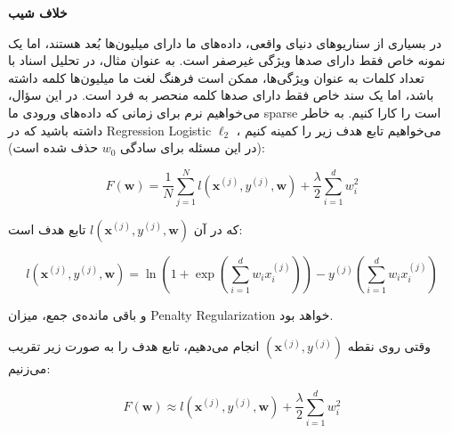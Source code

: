 \textbf{خلاف شیب}

در بسیاری از سناریوهای دنیای واقعی، داده‌های ما دارای میلیون‌ها بُعد هستند، اما یک نمونه خاص فقط دارای صدها ویژگی غیرصفر است. به عنوان مثال، در تحلیل اسناد با تعداد کلمات به عنوان ویژگی‌ها، ممکن است فرهنگ لغت ما میلیون‌ها کلمه داشته باشد، اما یک سند خاص فقط دارای صدها کلمه منحصر به فرد است. در این سؤال، می‌خواهیم نرم  برای زمانی که داده‌های ورودی ما sparse است را کارا کنیم. به خاطر داشته باشید که در Regression Logistic \(\ell_2\) ، می‌خواهیم تابع هدف زیر را کمینه کنیم (در این مسئله برای سادگی \(w_0\) حذف شده است):

\begin{latin}
\[
F(\mathbf{w}) = \frac{1}{N} \sum_{j=1}^N l(\mathbf{x}^{(j)}, y^{(j)}, \mathbf{w}) + \frac{\lambda}{2} \sum_{i=1}^d w_i^2
\]
\end{latin}

که در آن \(l(\mathbf{x}^{(j)}, y^{(j)}, \mathbf{w})\) تابع هدف است:

\begin{latin}
    
\[
l(\mathbf{x}^{(j)}, y^{(j)}, \mathbf{w}) =\ln \left( 1 + \exp \left( \sum_{i=1}^d w_i x_i^{(j)} \right)\right) - y^{(j)} \left( \sum_{i=1}^d w_i x_i^{(j)} \right) 
\]
\end{latin}

و باقی مانده‌ی جمع، میزان Penalty Regularization خواهد بود.

وقتی روی نقطه \((\mathbf{x}^{(j)}, y^{(j)})\)  انجام می‌دهیم، تابع هدف را به صورت زیر تقریب می‌زنیم:

\begin{latin}
    
\[
F(\mathbf{w}) \approx l(\mathbf{x}^{(j)}, y^{(j)}, \mathbf{w}) + \frac{\lambda}{2} \sum_{i=1}^d w_i^2
\]
\end{latin}


